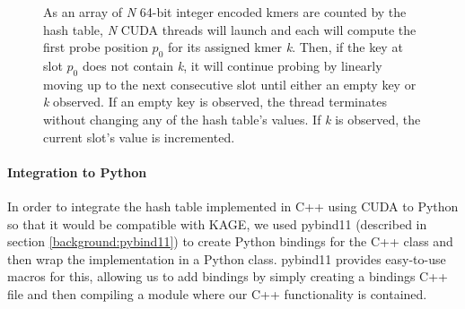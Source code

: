 \begin{figure}[H]
\begin{center}
{
}
\caption{
  As an array of \textit{N} 64-bit integer encoded kmers are counted by the hash table, \textit{N} CUDA threads will launch and each will compute the first probe position $p_0$ for its assigned kmer \textit{k}. Then, if the key at slot $p_0$ does not contain \textit{k}, it will continue probing by linearly moving up to the next consecutive slot until either an empty key or \textit{k} observed. If an empty key is observed, the thread terminates without changing any of the hash table's values. If \textit{k} is observed, the current slot's value is incremented.
}
\label{methods:gpu_accelerating_kmer_counting:figures:count_example}
\end{center}
\end{figure}

\paragraph{Integration to Python}
In order to integrate the hash table implemented in C++ using CUDA to Python so that it would be compatible with KAGE, we used pybind11 (described in section \ref{background:pybind11}) to create Python bindings for the C++ class and then wrap the implementation in a Python class.
pybind11 provides easy-to-use macros for this, allowing us to add bindings by simply creating a bindings C++ file and then compiling a module where our C++ functionality is contained.


